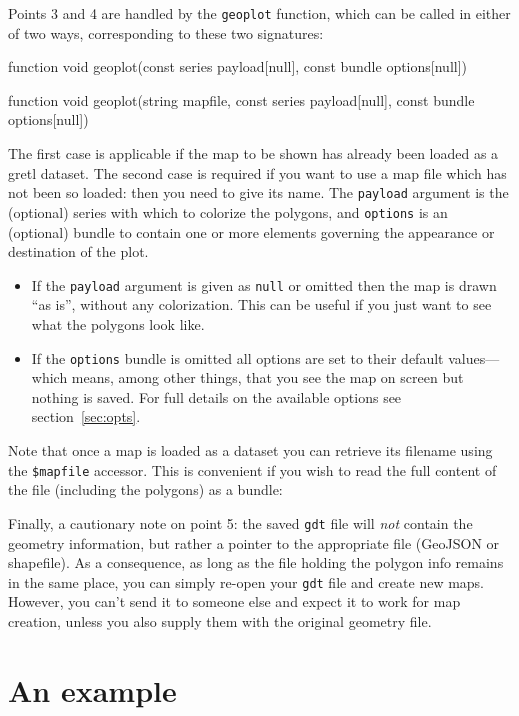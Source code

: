 \documentclass{article}
\begin{document}
Points 3 and 4 are handled by the \texttt{geoplot} function, which can
be called in either of two ways, corresponding to these two signatures:
\begin{code}
function void geoplot(const series payload[null], const bundle options[null])

function void geoplot(string mapfile, const series payload[null],
                      const bundle options[null])
\end{code}
The first case is applicable if the map to be shown has already been
loaded as a gretl dataset. The second case is required if you want to
use a map file which has not been so loaded: then you need to give its
name. The \texttt{payload} argument is the (optional) series with
which to colorize the polygons, and \texttt{options} is an (optional)
bundle to contain one or more elements governing the appearance or
destination of the plot.
\begin{itemize}
\item If the \texttt{payload} argument is given as \texttt{null} or
  omitted then the map is drawn ``as is'', without any
  colorization. This can be useful if you just want to see what the
  polygons look like.
\item If the \texttt{options} bundle is omitted all options are set to
  their default values---which means, among other things, that you see
  the map on screen but nothing is saved. For full details on the
  available options see section~\ref{sec:opts}.
\end{itemize}

Note that once a map is loaded as a dataset you can retrieve its
filename using the \verb|$mapfile| accessor. This is convenient if you
wish to read the full content of the file (including the polygons) as
a bundle:
Finally, a cautionary note on point 5: the saved \texttt{gdt} file
will \emph{not} contain the geometry information, but rather a pointer
to the appropriate file (GeoJSON or shapefile). As a consequence, as
long as the file holding the polygon info remains in the same place,
you can simply re-open your \texttt{gdt} file and create new
maps. However, you can't send it to someone else and expect it to work
for map creation, unless you also supply them with the original
geometry file.

\section{An example}
\label{sec:example}
\end{document}
